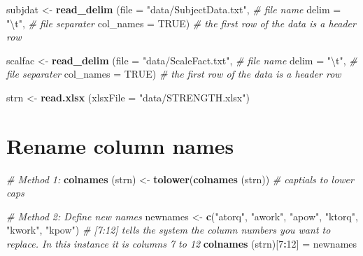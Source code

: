 \documentclass[
]{book}
\newenvironment{Shaded}{\begin{snugshade}}{\end{snugshade}}
\newcommand{\CharTok}[1]{\textcolor[rgb]{0.31,0.60,0.02}{#1}}
\newcommand{\CommentTok}[1]{\textcolor[rgb]{0.56,0.35,0.01}{\textit{#1}}}
\newcommand{\DataTypeTok}[1]{\textcolor[rgb]{0.13,0.29,0.53}{#1}}
\newcommand{\DecValTok}[1]{\textcolor[rgb]{0.00,0.00,0.81}{#1}}
\newcommand{\KeywordTok}[1]{\textcolor[rgb]{0.13,0.29,0.53}{\textbf{#1}}}
\newcommand{\NormalTok}[1]{#1}
\newcommand{\OperatorTok}[1]{\textcolor[rgb]{0.81,0.36,0.00}{\textbf{#1}}}
\newcommand{\OtherTok}[1]{\textcolor[rgb]{0.56,0.35,0.01}{#1}}
\newcommand{\StringTok}[1]{\textcolor[rgb]{0.31,0.60,0.02}{#1}}
\begin{document}
\begin{Shaded}
\begin{Highlighting}[]
\NormalTok{subjdat <-}\StringTok{  }\KeywordTok{read_delim}\NormalTok{ (}\DataTypeTok{file =} \StringTok{"data/SubjectData.txt"}\NormalTok{, }\CommentTok{# file name}
                        \DataTypeTok{delim =} \StringTok{"}\CharTok{\textbackslash{}t}\StringTok{"}\NormalTok{, }\CommentTok{# file separater}
                        \DataTypeTok{col_names =} \OtherTok{TRUE}\NormalTok{) }\CommentTok{# the first row of the data is a header row}

\NormalTok{scalfac <-}\StringTok{  }\KeywordTok{read_delim}\NormalTok{ (}\DataTypeTok{file =} \StringTok{"data/ScaleFact.txt"}\NormalTok{, }\CommentTok{# file name}
                        \DataTypeTok{delim =} \StringTok{"}\CharTok{\textbackslash{}t}\StringTok{"}\NormalTok{, }\CommentTok{# file separater}
                        \DataTypeTok{col_names =} \OtherTok{TRUE}\NormalTok{) }\CommentTok{# the first row of the data is a header row}

\NormalTok{strn <-}\StringTok{  }\KeywordTok{read.xlsx}\NormalTok{ (}\DataTypeTok{xlsxFile =} \StringTok{"data/STRENGTH.xlsx"}\NormalTok{)}
\end{Highlighting}
\end{Shaded}

\hypertarget{rename-column-names}{%
\section*{Rename column names}\label{rename-column-names}}

\begin{Shaded}
\begin{Highlighting}[]
\CommentTok{# Method 1:}
\KeywordTok{colnames}\NormalTok{ (strn) <-}\StringTok{  }\KeywordTok{tolower}\NormalTok{(}\KeywordTok{colnames}\NormalTok{ (strn)) }\CommentTok{# captials to lower caps}

\CommentTok{# Method 2: Define new names}
\NormalTok{newnames <-}\StringTok{ }\KeywordTok{c}\NormalTok{(}\StringTok{"atorq"}\NormalTok{, }\StringTok{"awork"}\NormalTok{, }\StringTok{"apow"}\NormalTok{, }\StringTok{"ktorq"}\NormalTok{, }\StringTok{"kwork"}\NormalTok{, }\StringTok{"kpow"}\NormalTok{)}
\CommentTok{# [7:12] tells the system the column numbers you want to replace. In this instance it is columns 7 to 12}
\KeywordTok{colnames}\NormalTok{ (strn)[}\DecValTok{7}\OperatorTok{:}\DecValTok{12}\NormalTok{] =}\StringTok{ }\NormalTok{newnames}
\end{Highlighting}
\end{Shaded}
\end{document}
